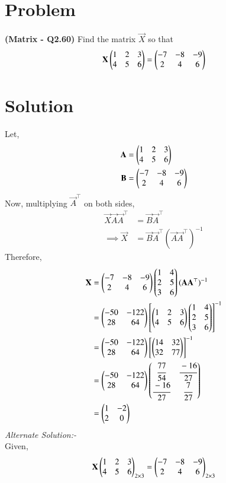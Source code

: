 \documentclass[journal,12pt,twocolumn]{IEEEtran}
\begin{document}
\section*{\textbf{Problem}}
\textbf{(Matrix - Q2.60)} Find the matrix $\vec{X}$ so that 
$$\mathbf{X}\begin{pmatrix}1 & 2 & 3\\ 4 & 5 & 6\end{pmatrix} = \begin{pmatrix}-7 & -8 & -9\\ 2 & 4 &6\end{pmatrix}$$
\section*{\textbf{Solution}}
Let,
\begin{align}
    \mathbf{A} &= \begin{pmatrix}1 & 2 & 3\\ 4 & 5 & 6\end{pmatrix}\\
    \mathbf{B} &= \begin{pmatrix}-7 & -8 & -9\\ 2 & 4 & 6\end{pmatrix}
\end{align}
Now, multiplying $\vec{A}^\top$ on both sides,
\begin{align}
    \vec{X}\vec{A}\vec{A}^\top &= \vec{B}\vec{A}^\top\\
   \implies \vec{X} &= \vec{B}\vec{A}^\top(\vec{A}\vec{A}^\top)^{-1}
\end{align}
Therefore,
\begin{align}
    \mathbf{X} &= \begin{pmatrix}-7 & -8 & -9\\ 2 & 4 & 6\end{pmatrix} \begin{pmatrix}1 & 4\\2 & 5\\3 & 6\end{pmatrix}(\mathbf{A}\mathbf{A}^\top)^{-1}\\
            &= \begin{pmatrix}-50 & -122\\ 28 & 64\end{pmatrix} \left[\begin{pmatrix}1 & 2 & 3\\ 4 & 5 & 6\end{pmatrix} \begin{pmatrix}1 & 4\\2 & 5\\3 & 6\end{pmatrix}\right]^{-1}\\
            &= \begin{pmatrix}-50 & -122\\ 28 & 64\end{pmatrix}\left[\begin{pmatrix}14 & 32\\32 & 77\end{pmatrix}\right]^{-1}\\
            &= \begin{pmatrix}-50 & -122\\ 28 & 64\end{pmatrix}\begin{pmatrix}\cfrac{77}{54}&\cfrac{-16}{27}\\ \cfrac{-16}{27}& \cfrac{7}{27}\end{pmatrix}\\
            &= \begin{pmatrix}1 & -2\\2 & 0\end{pmatrix}
\end{align}
\textit{Alternate Solution:-}\\
Given,
\begin{align}
    \mathbf{X}\begin{pmatrix}1 & 2 & 3\\ 4 & 5 & 6\end{pmatrix}_{2 \times 3} = \begin{pmatrix}-7 & -8 & -9\\ 2 & 4 &6\end{pmatrix}_{2 \times 3}\label{0.0.1}
\end{align}\\
\end{document}
